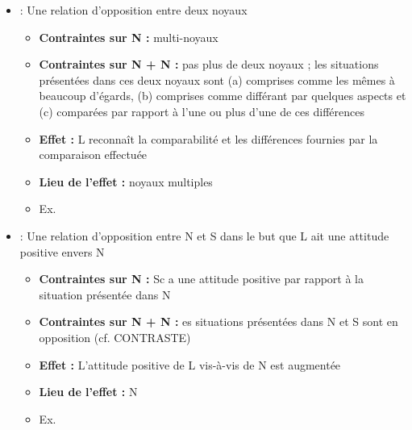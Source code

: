 \documentclass{KodeBook}
\begin{document}
\begin{itemize}
	\item {} :  Une relation d'opposition entre deux noyaux
	\begin{itemize}
		\item \textbf{Contraintes sur N :} multi-noyaux
		\item \textbf{Contraintes sur N + N :} pas plus de deux noyaux ; les situations présentées dans ces deux noyaux sont (a) comprises comme les mêmes à beaucoup d'égards, (b) comprises comme différant par quelques aspects et (c) comparées par rapport à l'une ou plus d'une de ces différences
		\item \textbf{Effet :}  L reconnaît la comparabilité et les différences fournies par la comparaison effectuée
		\item \textbf{Lieu de l'effet :} noyaux multiples
		\item Ex. 
	\end{itemize}
\end{itemize}

\begin{itemize}
	\item {} :  Une relation d'opposition entre N et S dans le but que L ait une attitude positive envers N
	\begin{itemize}
		\item \textbf{Contraintes sur N :} Sc a une attitude positive par rapport à la situation présentée dans N
		\item \textbf{Contraintes sur N + N :} es situations présentées dans N et S sont en opposition (cf. CONTRASTE)
		\item \textbf{Effet :}  L'attitude positive de L vis-à-vis de N est augmentée
		\item \textbf{Lieu de l'effet :} N
		\item Ex. 
	\end{itemize}
\end{itemize}
\end{document}
